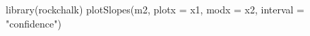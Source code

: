 \begin{Schunk}
\begin{Sinput}
 library(rockchalk)
 plotSlopes(m2, plotx = x1, modx = x2, interval = "confidence")
\end{Sinput}
\end{Schunk}
